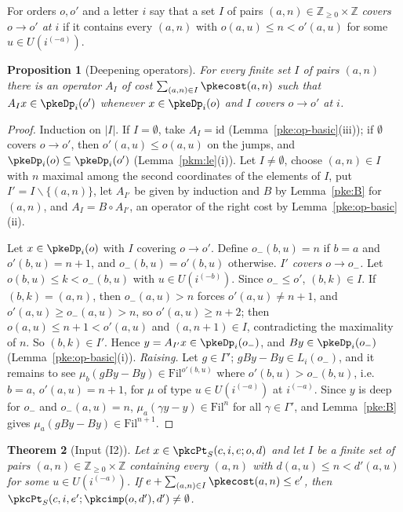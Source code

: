 \documentclass[10pt]{amsart}
\newtheorem{theorem}{Theorem}[section]
\newtheorem{proposition}[theorem]{Proposition}
\theoremstyle{definition}
\theoremstyle{remark}
\newcommand{\Z}{\mathbb Z}
\begin{document}
For orders $o,o'$ and a letter $i$ say that a set $I$ of pairs $(a,n)\in\Z_{\ge0}\times\Z$ \emph{covers
$o\to o'$ at $i$} if it contains every $(a,n)$ with $o(a,u)\le n<o'(a,u)$ for some $u\in U(i^{(-a)})$.

\begin{proposition}[Deepening operators]\label{pke:A}
For every finite set $I$ of pairs $(a,n)$ there is an operator $A_I$ of cost $\sum_{(a,n)\in I}\pkecost(a,n)$
such that $A_Ix\in\pkeDp_i(o')$ whenever $x\in\pkeDp_i(o)$ and $I$ covers $o\to o'$ at $i$.
\end{proposition}

\begin{proof}
Induction on $|I|$. If $I=\emptyset$, take $A_I=\mathrm{id}$ (Lemma~\ref{pke:op-basic}(iii)); if $\emptyset$
covers $o\to o'$, then $o'(a,u)\le o(a,u)$ on the jumps, and $\pkeDp_i(o)\subseteq\pkeDp_i(o')$
(Lemma~\ref{pkm:le}(i)). Let $I\ne\emptyset$, choose $(a,n)\in I$ with $n$ maximal among the second coordinates
of the elements of $I$, put $I'=I\smallsetminus\{(a,n)\}$, let $A_{I'}$ be given by induction and $B$ by
Lemma~\ref{pke:B} for $(a,n)$, and $A_I=B\circ A_{I'}$, an operator of the right cost by
Lemma~\ref{pke:op-basic}(ii).

Let $x\in\pkeDp_i(o)$ with $I$ covering $o\to o'$. Define $o_-(b,u)=n$ if $b=a$ and $o'(b,u)=n+1$, and
$o_-(b,u)=o'(b,u)$ otherwise. \emph{$I'$ covers $o\to o_-$.} Let $o(b,u)\le k<o_-(b,u)$ with $u\in
U(i^{(-b)})$. Since $o_-\le o'$, $(b,k)\in I$. If $(b,k)=(a,n)$, then $o_-(a,u)>n$ forces $o'(a,u)\ne n+1$, and
$o'(a,u)\ge o_-(a,u)>n$, so $o'(a,u)\ge n+2$; then $o(a,u)\le n+1<o'(a,u)$ and $(a,n+1)\in I$, contradicting the
maximality of $n$. So $(b,k)\in I'$. Hence $y=A_{I'}x\in\pkeDp_i(o_-)$, and $By\in\pkeDp_i(o_-)$
(Lemma~\ref{pke:op-basic}(i)). \emph{Raising.} Let $g\in\Gamma'$; $gBy-By\in L_i(o_-)$, and it remains to see
$\mu_b(gBy-By)\in\mathrm{Fil}^{o'(b,u)}$ where $o'(b,u)>o_-(b,u)$, i.e.\ $b=a$, $o'(a,u)=n+1$, for $\mu$ of type
$u\in U(i^{(-a)})$ at $i^{(-a)}$. Since $y$ is deep for $o_-$ and $o_-(a,u)=n$, $\mu_a(\gamma y-y)\in\mathrm{Fil}^n$
for all $\gamma\in\Gamma'$, and Lemma~\ref{pke:B} gives $\mu_a(gBy-By)\in\mathrm{Fil}^{n+1}$.
\end{proof}

\begin{theorem}[Input (I2)]\label{pke:I2}
Let $x\in\pkcPt_S(c,i,e;o,d)$ and let $I$ be a finite set of pairs $(a,n)\in\Z_{\ge0}\times\Z$ containing every
$(a,n)$ with $d(a,u)\le n<d'(a,u)$ for some $u\in U(i^{(-a)})$. If $e+\sum_{(a,n)\in I}\pkecost(a,n)\le e'$,
then $\pkcPt_S(c,i,e';\pkcimp(o,d'),d')\ne\emptyset$.
\end{theorem}
\end{document}
